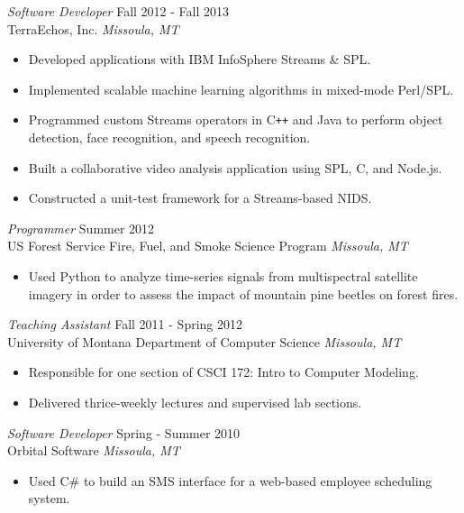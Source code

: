 \documentclass[line,margin]{res}
\begin{document}
\begin{resume}
        {\sl Software Developer} \hfill  Fall 2012 - Fall 2013\\
        TerraEchos, Inc. \hfill {\sl Missoula, MT}
        \begin{itemize} \itemsep -2pt
            \item Developed applications with IBM InfoSphere\textsuperscript{\textregistered} Streams \& SPL.
            \item Implemented scalable machine learning algorithms in mixed-mode Perl/SPL.
            \item Programmed custom Streams operators in C\verb!++! and Java to perform object detection, face recognition, and speech recognition.
            \item Built a collaborative video analysis application using SPL, C, and Node.js.
            \item Constructed a unit-test framework for a Streams-based NIDS.
        \end{itemize}

        {\sl Programmer} \hfill  Summer 2012\\
        US Forest Service Fire, Fuel, and Smoke Science Program \hfill {\sl Missoula, MT}
        \begin{itemize} \itemsep -2pt
            \item Used Python to analyze time-series signals from multispectral satellite imagery in order to assess the impact of mountain pine beetles on forest fires.
        \end{itemize}

        {\sl Teaching Assistant} \hfill  Fall 2011 - Spring 2012\\
        University of Montana Department of Computer Science \hfill {\sl Missoula, MT}
        \begin{itemize} \itemsep -2pt
            \item Responsible for one section of CSCI 172: Intro to Computer Modeling.
            \item Delivered thrice-weekly lectures and supervised lab sections.
        \end{itemize}

        {\sl Software Developer} \hfill Spring - Summer 2010\\
        Orbital Software \hfill {\sl Missoula, MT}
        \begin{itemize} \itemsep -2pt
            \item Used C\# to build an SMS interface for a web-based employee scheduling system.
        \end{itemize}


\end{resume}
\end{document}
